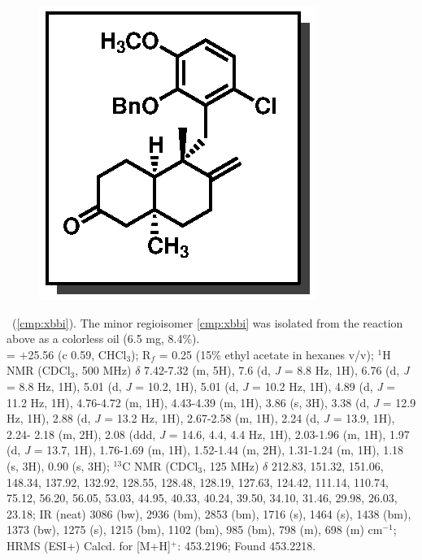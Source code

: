 \vspace{10pt}
\begin{figure}
  \vspace{-15pt}
  \begin{center}
    \includegraphics[scale=0.8]{chp_singlecarbon/images/xbbi}
  \end{center}
  \vspace{-30pt}
\end{figure}\noindent \textbf{\CMPxbbi}\ (\ref{cmp:xbbi}). The minor regioisomer \ref{cmp:xbbi}
was isolated from the reaction above as a colorless oil (6.5 mg, 8.4\%). \\
\rotation = $+$25.56 (c 0.59, CHCl$_3$); R$_f$ = 0.25 (15\% ethyl acetate in
hexanes v/v); $^1$H NMR (CDCl$_3$, 500 MHz) $\delta$ 7.42-7.32 (m, 5H), 7.6 (d, \textit{J} =
8.8 Hz, 1H), 6.76 (d, \textit{J} = 8.8 Hz, 1H), 5.01 (d, \textit{J} = 10.2, 1H), 5.01 (d, \textit{J} =
10.2 Hz, 1H), 4.89 (d, \textit{J} = 11.2 Hz, 1H), 4.76-4.72 (m, 1H), 4.43-4.39 (m, 1H), 3.86 (s, 3H), 3.38
(d, \textit{J} = 12.9 Hz, 1H), 2.88 (d, \textit{J} = 13.2 Hz, 1H), 2.67-2.58 (m, 1H), 2.24 (d, \textit{J} = 13.9, 1H), 2.24-
2.18 (m, 2H), 2.08 (ddd, \textit{J} = 14.6, 4.4, 4.4 Hz, 1H), 2.03-1.96 (m, 1H), 1.97 (d, \textit{J} = 13.7, 1H),
1.76-1.69 (m, 1H), 1.52-1.44 (m, 2H), 1.31-1.24 (m, 1H), 1.18 (s, 3H), 0.90 (s, 3H); $^{13}$C NMR
(CDCl$_3$, 125 MHz) $\delta$ 212.83, 151.32, 151.06, 148.34, 137.92, 132.92, 128.55, 128.48, 128.19,
127.63, 124.42, 111.14, 110.74, 75.12, 56.20, 56.05, 53.03, 44.95, 40.33, 40.24, 39.50, 34.10,
31.46, 29.98, 26.03, 23.18; IR (neat) 3086 (bw), 2936 (bm), 2853 (bm), 1716 (s), 1464 (s), 1438
(bm), 1373 (bw), 1275 (s), 1215 (bm), 1102 (bm), 985 (bm), 798 (m), 698 (m) cm$^{-1}$;
HRMS (ESI+) Calcd. for  [M+H]$^+$: 453.2196; Found 453.2218.

